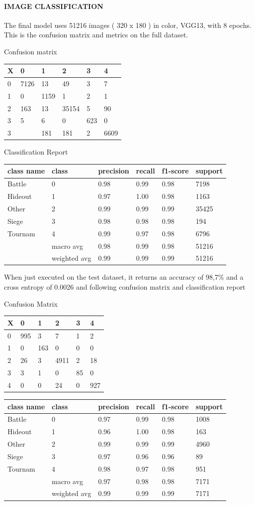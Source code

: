 \documentclass[
]{article}
\begin{document}
\hypertarget{image-classification}{%
\paragraph{IMAGE CLASSIFICATION}\label{image-classification}}

The final model uses 51216 images ( 320 x 180 ) in color, VGG13, with 8
epochs. This is the confusion matrix and metrics on the full dataset.

Confusion matrix

\begin{longtable}[]{@{}llllll@{}}
\toprule
X & 0 & 1 & 2 & 3 & 4\tabularnewline
\midrule
\endhead
0 & 7126 & 13 & 49 & 3 & 7\tabularnewline
1 & 0 & 1159 & 1 & 2 & 1\tabularnewline
2 & 163 & 13 & 35154 & 5 & 90\tabularnewline
3 & 5 & 6 & 0 & 623 & 0\tabularnewline
3 & & 181 & 181 & 2 & 6609\tabularnewline
\bottomrule
\end{longtable}

Classification Report

\begin{longtable}[]{@{}llllll@{}}
\toprule
class name & class & precision & recall & f1-score &
support\tabularnewline
\midrule
\endhead
Battle & 0 & 0.98 & 0.99 & 0.98 & 7198\tabularnewline
Hideout & 1 & 0.97 & 1.00 & 0.98 & 1163\tabularnewline
Other & 2 & 0.99 & 0.99 & 0.99 & 35425\tabularnewline
Siege & 3 & 0.98 & 0.98 & 0.98 & 194\tabularnewline
Tournam & 4 & 0.99 & 0.97 & 0.98 & 6796\tabularnewline
& macro avg & 0.98 & 0.99 & 0.98 & 51216\tabularnewline
& weighted avg & 0.99 & 0.99 & 0.99 & 51216\tabularnewline
\bottomrule
\end{longtable}

When just executed on the test dataset, it returns an accuracy of 98,7\%
and a cross entropy of 0.0026 and following confusion matrix and
classification report

Confusion Matrix

\begin{longtable}[]{@{}llllll@{}}
\toprule
X & 0 & 1 & 2 & 3 & 4\tabularnewline
\midrule
\endhead
0 & 995 & 3 & 7 & 1 & 2\tabularnewline
1 & 0 & 163 & 0 & 0 & 0\tabularnewline
2 & 26 & 3 & 4911 & 2 & 18\tabularnewline
3 & 3 & 1 & 0 & 85 & 0\tabularnewline
4 & 0 & 0 & 24 & 0 & 927\tabularnewline
\bottomrule
\end{longtable}

\begin{longtable}[]{@{}llllll@{}}
\toprule
class name & class & precision & recall & f1-score &
support\tabularnewline
\midrule
\endhead
Battle & 0 & 0.97 & 0.99 & 0.98 & 1008\tabularnewline
Hideout & 1 & 0.96 & 1.00 & 0.98 & 163\tabularnewline
Other & 2 & 0.99 & 0.99 & 0.99 & 4960\tabularnewline
Siege & 3 & 0.97 & 0.96 & 0.96 & 89\tabularnewline
Tournam & 4 & 0.98 & 0.97 & 0.98 & 951\tabularnewline
& macro avg & 0.97 & 0.98 & 0.98 & 7171\tabularnewline
& weighted avg & 0.99 & 0.99 & 0.99 & 7171\tabularnewline
\bottomrule
\end{longtable}
\end{document}
